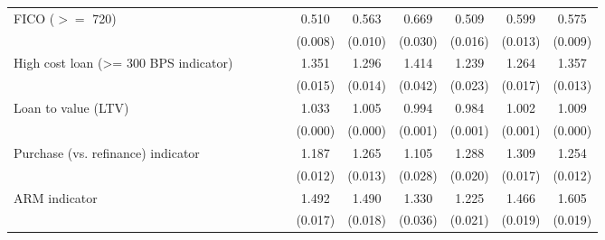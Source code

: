 {\begin{tabular}{l*{10}{c}}
FICO ($>=$ 720)     &                     &                     &                     &                     &       0.510\sym{***}&       0.563\sym{***}&       0.669\sym{***}&       0.509\sym{***}&       0.599\sym{***}&       0.575\sym{***}\\
                    &                     &                     &                     &                     &     (0.008)         &     (0.010)         &     (0.030)         &     (0.016)         &     (0.013)         &     (0.009)         \\
High cost loan (\textgreater = 300 BPS indicator)&                     &                     &                     &                     &       1.351\sym{***}&       1.296\sym{***}&       1.414\sym{***}&       1.239\sym{***}&       1.264\sym{***}&       1.357\sym{***}\\
                    &                     &                     &                     &                     &     (0.015)         &     (0.014)         &     (0.042)         &     (0.023)         &     (0.017)         &     (0.013)         \\
Loan to value (LTV) &                     &                     &                     &                     &       1.033\sym{***}&       1.005\sym{***}&       0.994\sym{***}&       0.984\sym{***}&       1.002\sym{**} &       1.009\sym{***}\\
                    &                     &                     &                     &                     &     (0.000)         &     (0.000)         &     (0.001)         &     (0.001)         &     (0.001)         &     (0.000)         \\
Purchase (vs. refinance) indicator&                     &                     &                     &                     &       1.187\sym{***}&       1.265\sym{***}&       1.105\sym{***}&       1.288\sym{***}&       1.309\sym{***}&       1.254\sym{***}\\
                    &                     &                     &                     &                     &     (0.012)         &     (0.013)         &     (0.028)         &     (0.020)         &     (0.017)         &     (0.012)         \\
ARM indicator       &                     &                     &                     &                     &       1.492\sym{***}&       1.490\sym{***}&       1.330\sym{***}&       1.225\sym{***}&       1.466\sym{***}&       1.605\sym{***}\\
                    &                     &                     &                     &                     &     (0.017)         &     (0.018)         &     (0.036)         &     (0.021)         &     (0.019)         &     (0.019)         \\

\end{tabular}}
